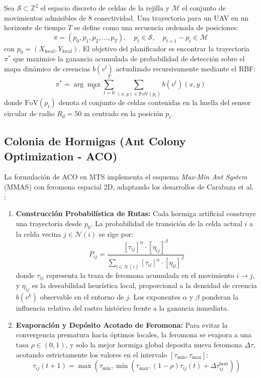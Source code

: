 Sea $\mathcal{S} \subset \mathbb{Z}^2$ el espacio discreto de celdas de la rejilla y $\mathcal{M}$ el conjunto de movimientos admisibles de 8 conectividad. Una trayectoria para un UAV en un horizonte de tiempo $T$ se define como una secuencia ordenada de posiciones:
\begin{equation}
\pi = \left( p_0, p_1, p_2, \dots, p_T \right), \quad p_t \in \mathcal{S}, \quad p_{t+1} - p_t \in \mathcal{M}
\end{equation}
con $p_0 = (X_{\text{local}}, Y_{\text{local}})$. El objetivo del planificador es encontrar la trayectoria $\pi^*$ que maximice la ganancia acumulada de probabilidad de detección sobre el mapa dinámico de creencias $b(v^t)$ actualizado recursivamente mediante el RBF:
\begin{equation}
\pi^* = \arg\max_{\pi} \sum_{t=0}^{T} \sum_{(x,y) \in \text{FoV}(p_t)} b(v^t)(x, y)
\end{equation}
donde $\text{FoV}(p_t)$ denota el conjunto de celdas contenidas en la huella del sensor circular de radio $R_d = 50\text{ m}$ centrado en la posición $p_t$.

\subsection{Colonia de Hormigas (Ant Colony Optimization - ACO)}

La formulación de ACO en MTS implementa el esquema \textit{Max-Min Ant System} (MMAS) con feromona espacial 2D, adaptando los desarrollos de Carabaza et al. \cite{carabaza-ACOr, carabaza_ingles}:
\begin{enumerate}
    \item \textbf{Construcción Probabilística de Rutas:} Cada hormiga artificial construye una trayectoria desde $p_0$. La probabilidad de transición de la celda actual $i$ a la celda vecina $j \in \mathcal{N}(i)$ se rige por:
    \begin{equation}
    P_{ij} = \frac{[\tau_{ij}]^\alpha \cdot [\eta_{ij}]^\beta}{\sum_{l \in \mathcal{N}(i)} [\tau_{il}]^\alpha \cdot [\eta_{il}]^\beta}
    \end{equation}
    donde $\tau_{ij}$ representa la traza de feromona acumulada en el movimiento $i \to j$, y $\eta_{ij}$ es la deseabilidad heurística local, proporcional a la densidad de creencia $b(v^k)$ observable en el entorno de $j$. Los exponentes $\alpha$ y $\beta$ ponderan la influencia relativa del rastro histórico frente a la ganancia inmediata.
    \item \textbf{Evaporación y Depósito Acotado de Feromona:} Para evitar la convergencia prematura hacia óptimos locales, la feromona se evapora a una tasa $\rho \in (0,1)$, y solo la mejor hormiga global deposita nueva feromona $\Delta \tau$, acotando estrictamente los valores en el intervalo $[\tau_{\min}, \tau_{\max}]$:
    \begin{equation}
    \tau_{ij}(t+1) = \max \left( \tau_{\min}, \min \left( \tau_{\max}, (1-\rho)\tau_{ij}(t) + \Delta \tau_{ij}^{\text{best}} \right) \right)
    \end{equation}
\end{enumerate}

